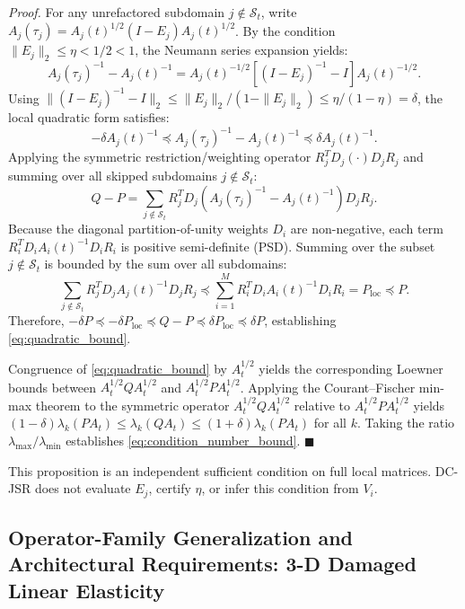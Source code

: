 \documentclass[preprint,12pt,3p]{elsarticle}
\begin{document}
\noindent\textit{Proof.}
For any unrefactored subdomain $j \notin \mathcal{S}_t$, write $A_j(\tau_j) = A_j(t)^{1/2} (I - E_j) A_j(t)^{1/2}$. By the condition $\|E_j\|_2 \le \eta < 1/2 < 1$, the Neumann series expansion yields:
\begin{equation}
A_j(\tau_j)^{-1} - A_j(t)^{-1} = A_j(t)^{-1/2} \left[ (I - E_j)^{-1} - I \right] A_j(t)^{-1/2}.
\end{equation}
Using $\|(I - E_j)^{-1} - I\|_2 \le \|E_j\|_2 / (1 - \|E_j\|_2) \le \eta / (1 - \eta) = \delta$, the local quadratic form satisfies:
\begin{equation}
-\delta A_j(t)^{-1} \preceq A_j(\tau_j)^{-1} - A_j(t)^{-1} \preceq \delta A_j(t)^{-1}.
\end{equation}
Applying the symmetric restriction/weighting operator $R_j^T D_j (\cdot) D_j R_j$ and summing over all skipped subdomains $j \notin \mathcal{S}_t$:
\begin{equation}
Q - P = \sum_{j \notin \mathcal{S}_t} R_j^T D_j \left( A_j(\tau_j)^{-1} - A_j(t)^{-1} \right) D_j R_j.
\end{equation}
Because the diagonal partition-of-unity weights $D_i$ are non-negative, each term $R_i^T D_i A_i(t)^{-1} D_i R_i$ is positive semi-definite (PSD). Summing over the subset $j \notin \mathcal{S}_t$ is bounded by the sum over all subdomains:
\begin{equation}
\sum_{j \notin \mathcal{S}_t} R_j^T D_j A_j(t)^{-1} D_j R_j \preceq \sum_{i=1}^M R_i^T D_i A_i(t)^{-1} D_i R_i = P_{\text{loc}} \preceq P.
\end{equation}
Therefore, $-\delta P \preceq -\delta P_{\text{loc}} \preceq Q - P \preceq \delta P_{\text{loc}} \preceq \delta P$, establishing \eqref{eq:quadratic_bound}. 

Congruence of \eqref{eq:quadratic_bound} by $A_t^{1/2}$ yields the corresponding Loewner bounds between $A_t^{1/2}QA_t^{1/2}$ and $A_t^{1/2}PA_t^{1/2}$. Applying the Courant--Fischer min-max theorem to the symmetric operator $A_t^{1/2} Q A_t^{1/2}$ relative to $A_t^{1/2} P A_t^{1/2}$ yields $(1 - \delta) \lambda_k(P A_t) \le \lambda_k(Q A_t) \le (1 + \delta) \lambda_k(P A_t)$ for all $k$. Taking the ratio $\lambda_{\max} / \lambda_{\min}$ establishes \eqref{eq:condition_number_bound}. \hfill $\blacksquare$


This proposition is an independent sufficient condition on full local matrices. DC-JSR does not evaluate $E_j$, certify $\eta$, or infer this condition from $V_i$.

\subsection{Operator-Family Generalization and Architectural Requirements: 3-D Damaged Linear Elasticity}
\label{subsec:elasticity_generalization}
\end{document}
